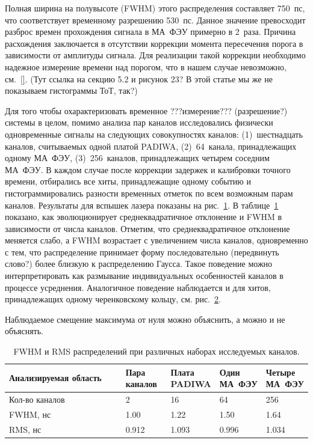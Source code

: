 Полная ширина на полувысоте (FWHM) этого распределения составляет 750~пс, что соответствует временному разрешению 530~пс. Данное значение превосходит разброс времен прохождения сигнала в МА~ФЭУ примерно в 2~раза. Причина расхождения заключается в отсутствии коррекции момента пересечения порога в зависимости от амплитуды сигнала. Для реализации такой коррекции необходимо надежное измерение времени над порогом, что в нашем случае невозможно, см.~\ref{}.
(Тут ссылка на секцию 5.2 и рисунок 23? В этой статье мы же не показываем гистограммы ТоТ, так?)

Для того чтобы охарактеризовать временное ???измерение??? (разрешение?) системы в целом, помимо анализа пар каналов исследовались физически одновременные сигналы на следующих совокупностях каналов: (1)~шестнадцать каналов, считываемых одной платой PADIWA, (2)~64~канала, принадлежащих одному МА~ФЭУ, (3)~256~каналов, принадлежащих четырем соседним МА~ФЭУ. В каждом случае после коррекции задержек и калибровки точного времени, отбирались все хиты, принадлежащие одному событию и гистограммировались разности временных отметок по всем возможным парам каналов. Результаты для вспышек лазера показаны на рис.~\ref{fig:TimeResEvolutionLaser}. В таблице~\ref{tabl:EvolutionParams} показано, как эволюционирует среднеквадратичное отклонение и FWHM в зависимости от числа каналов.
Отметим, что среднеквадратичное отклонение меняется слабо, а FWHM возрастает с увеличением числа каналов, одновременно с тем, что распределение принимает форму последовательно (передвинуть слово?) более близкую к распределению Гаусса. Такое поведение можно интерпретировать как размывание индивидуальных особенностей каналов в процессе усреднения. Аналогичное поведение наблюдается и для хитов, принадлежащих одному черенковскому кольцу, см. рис.~\ref{fig:TimeResEvolutionRings}.

Наблюдаемое смещение максимума от нуля можно объяснить, а можно и не объяснять.

\begin{figure}
\label{fig:TimeResEvolutionLaser}
\end{figure}

\begin{figure}
\label{fig:TimeResEvolutionRings}
\end{figure}

\begin{table}[h]
\caption{FWHM и RMS распределений при различных наборах исследуемых каналов.}
\label{tabl:EvolutionParams}
\begin{tabular}{ | p{0.4\linewidth} | p{0.15\linewidth} | p{0.15\linewidth} | p{0.15\linewidth} | p{0.15\linewidth} | }
	\hline
	Анализируемая область & Пара каналов & Плата PADIWA & Один МА~ФЭУ & Четыре МА~ФЭУ \\
	\hline
	Кол-во каналов & 2 & 16 & 64 & 256 \\
	\hline
	FWHM, нс & 1.00 & 1.22 & 1.50 & 1.64 \\
	\hline
	RMS, нс & 0.912 & 1.093 & 0.996 & 1.034 \\
	\hline
\end{tabular}
\end{table}
